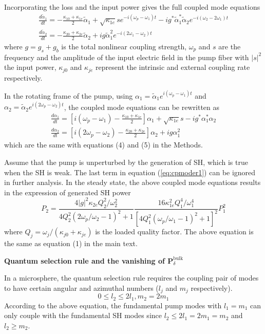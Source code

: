 \documentclass[a4paper,8pt,hyperref, aps, prl]{article}
\begin{document}
Incorporating the loss and the input power gives the full coupled mode equations
\begin{gather}
\frac{d{\tilde{\alpha}_1}}{dt} = -\frac{\kappa_{10}+\kappa_{1e}}{2}\tilde{\alpha}_1+\sqrt{\kappa_{1e}}se^{-i(\omega_p-\omega_1)t}-ig^*\tilde{\alpha}_1^*\tilde{\alpha}_2e^{-i(\omega_2-2\omega_1)t} \label{eq:cpmode1}\\
\frac{d\tilde{\alpha}_2}{dt} = -\frac{\kappa_{20}+\kappa_{2e}}{2}\tilde{\alpha}_2+ig\tilde{\alpha}_1^2e^{-i(2\omega_1-\omega_2)t}
\label{eq:cpmode2}
\end{gather}
where $g=g_s+g_b$ is the total nonlinear coupling strength, $\omega_p$ and $s$ are the frequency and the amplitude of the input electric field in the pump fiber with $|s|^2$ the input power, $\kappa_{j0}$ and $\kappa_{je}$ represent the intrinsic and external coupling rate respectively.

In the rotating frame of the pump, using ${\alpha}_1 = \tilde{\alpha}_1e^{i(\omega_p-\omega_1)t}$ and ${\alpha}_2 = \tilde{\alpha}_2e^{i(2\omega_p-\omega_2)t}$, the coupled mode equations can be rewritten as
\begin{gather}
\label{eq:cpmoder1}
\frac{d{\alpha}_1}{dt} = [i(\omega_p-\omega_1)-\frac{\kappa_{10}+\kappa_{1e}}{2}]{\alpha}_1+\sqrt{\kappa_{1e}}s-ig^*{\alpha}_1^*{\alpha}_2 \\
\frac{d{\alpha}_2}{dt} = [i(2\omega_p-\omega_2)-\frac{\kappa_{20}+\kappa_{2e}}{2}]{\alpha}_2+ig{\alpha}_1^2
\label{eq:cpmoder2}
\end{gather}
which are the same with equations (4) and (5) in the Methods.

Assume that the pump is unperturbed by the generation of SH, which is true when the SH is weak. The last term in equation (\ref{eq:cpmoder1})  can be ignored in further analysis. In the steady state, the above coupled mode equations results in the expression of generated SH power
\begin{equation}
P_2 = \frac{4|g|^2\kappa_{2e}Q_2^2/\omega_2^2}{4Q_2^2(2\omega_p/\omega_2-1)^2+1}\frac{16\kappa_{1e}^2Q_1^4/\omega_1^4}{[4Q_1^2(\omega_p/\omega_1-1)^2+1]^2}P_1^2
\end{equation}
where $Q_j = \omega_j/(\kappa_{j0}+\kappa_{je})$ is the loaded quality factor. The above equation is the same as equation (1) in the main text.

\textbf{Quantum selection rule and the vanishing of $\mathbf{P}^{\mathrm{bulk}}_\delta$} 

In a microsphere, the quantum selection rule requires the coupling pair of modes to have certain angular and azimuthal numbers ($l_j$ and $m_j$ respectively). 
\begin{equation}
0 \le l_2 \le 2l_1, m_2 = 2m_1
\end{equation}
According to the above equation, the fundamental pump modes with $l_1 = m_1$ can only couple with the fundamental SH modes since $l_2 \le 2l_1 = 2m_1 = m_2$ and $l_2 \ge m_2$.
\end{document}
